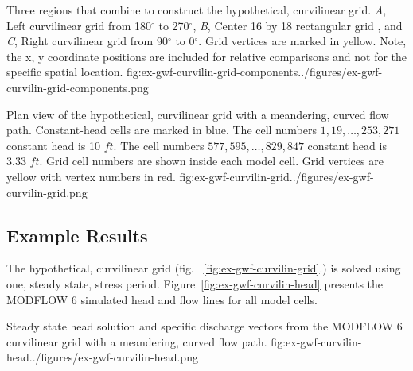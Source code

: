 \begin{StandardFigure}{
                                     Three regions that combine to construct the hypothetical, curvilinear grid. 
                                     \textit{A}, Left curvilinear grid from 180$^{\circ}$ to 270$^{\circ}$, 
                                     \textit{B}, Center 16 by 18 rectangular grid , and 
                                     \textit{C}, Right curvilinear grid from 90$^{\circ}$ to 0$^{\circ}$. 
                                     Grid vertices are marked in yellow. Note, the x, y coordinate positions 
                                     are included for relative comparisons and not for the specific spatial location. 
                                     }{fig:ex-gwf-curvilin-grid-components}{../figures/ex-gwf-curvilin-grid-components.png}
\end{StandardFigure}

\begin{StandardFigure}{
                                     Plan view of the hypothetical, curvilinear grid with a meandering, curved flow path. 
                                     Constant-head cells are marked in blue. 
                                     The cell numbers $1, 19, \ldots, 253, 271$ constant head is 10 $ft$. The cell numbers $577, 595, \ldots, 829, 847$ constant head is 3.33 $ft$. 
                                     Grid cell numbers are shown inside each model cell. 
                                     Grid vertices are yellow with vertex numbers in red. 
                                     }{fig:ex-gwf-curvilin-grid}{../figures/ex-gwf-curvilin-grid.png}
\end{StandardFigure}



\subsection{Example Results}
The hypothetical, curvilinear grid (fig. ~\ref{fig:ex-gwf-curvilin-grid}.) is solved using one, steady state, stress period. Figure~\ref{fig:ex-gwf-curvilin-head} presents the MODFLOW 6 simulated head and flow lines for all model cells.

\begin{StandardFigure}{
                                     Steady state head solution and specific discharge vectors from the MODFLOW 6 curvilinear grid with a meandering, curved flow path.
                                     }{fig:ex-gwf-curvilin-head}{../figures/ex-gwf-curvilin-head.png}
\end{StandardFigure}


